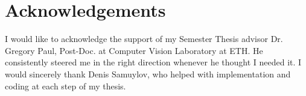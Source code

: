 %
\chapter*{Acknowledgements}
I would like to acknowledge the support of my Semester Thesis advisor Dr. Gregory Paul, Post-Doc. at Computer Vision Laboratory at ETH. He consistently steered me in the right direction whenever he thought I needed it. I would sincerely thank Denis Samuylov, who helped with implementation and coding at each step of my thesis. 


